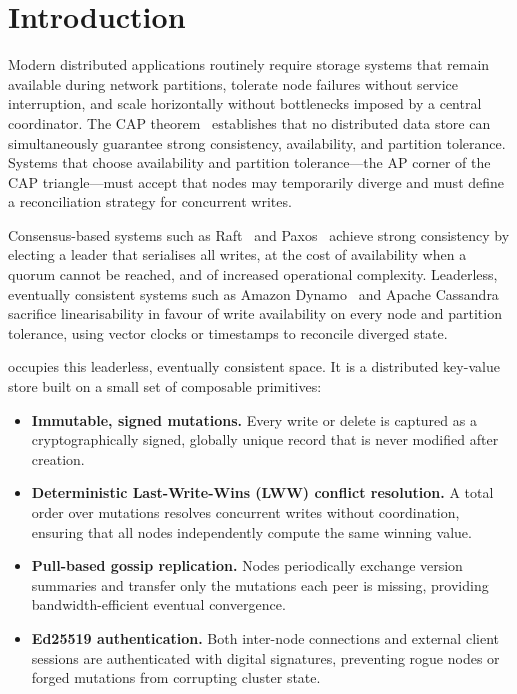 \section{Introduction}
\label{sec:intro}

Modern distributed applications routinely require storage systems that remain
available during network partitions, tolerate node failures without service
interruption, and scale horizontally without bottlenecks imposed by a central
coordinator. The CAP theorem~\cite{brewer2000cap,gilbert2002cap} establishes
that no distributed data store can simultaneously guarantee strong consistency,
availability, and partition tolerance. Systems that choose availability and
partition tolerance---the AP corner of the CAP triangle---must accept that nodes
may temporarily diverge and must define a reconciliation strategy for concurrent
writes.

Consensus-based systems such as Raft~\cite{ongaro2014raft} and
Paxos~\cite{lamport2001paxos} achieve strong consistency by electing a leader
that serialises all writes, at the cost of availability when a quorum cannot be
reached, and of increased operational complexity. Leaderless, eventually consistent
systems such as Amazon Dynamo~\cite{decandia2007dynamo} and Apache Cassandra
sacrifice linearisability in favour of write availability on every node and
partition tolerance, using vector clocks or timestamps to reconcile diverged state.

\pebble{} occupies this leaderless, eventually consistent space. It is a
distributed key-value store built on a small set of composable primitives:

\begin{itemize}[leftmargin=1.5em]
  \item \textbf{Immutable, signed mutations.} Every write or delete is captured
        as a cryptographically signed, globally unique record that is never
        modified after creation.
  \item \textbf{Deterministic Last-Write-Wins (LWW) conflict resolution.} A
        total order over mutations resolves concurrent writes without coordination,
        ensuring that all nodes independently compute the same winning value.
  \item \textbf{Pull-based gossip replication.} Nodes periodically exchange
        version summaries and transfer only the mutations each peer is missing,
        providing bandwidth-efficient eventual convergence.
  \item \textbf{Ed25519 authentication.} Both inter-node connections and external
        client sessions are authenticated with digital signatures, preventing
        rogue nodes or forged mutations from corrupting cluster state.
\end{itemize}

